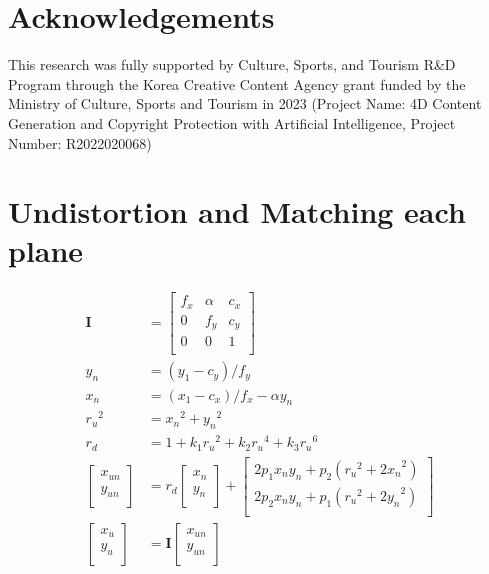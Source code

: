 \documentclass[preprint,12pt,authoryear]{elsarticle}
\begin{document}
\section*{Acknowledgements}
This research was fully supported by Culture, Sports, and Tourism R\&D Program through the Korea Creative Content Agency grant funded by the Ministry of Culture, Sports and Tourism in 2023 (Project Name: 4D Content Generation and Copyright Protection with Artificial Intelligence, Project Number: R2022020068)

\appendix

\section{Undistortion and Matching each plane}
\label{sec:equations}
\begin{equation}
\begin{aligned}
\textbf{I}&=\begin{bmatrix}
 f_{x} & \alpha & c_{x}  \\
 0 & f_{y} & c_{y}  \\
 0 & 0 & 1  \\
\end{bmatrix} \\
y_{n}&=(y_{1}-c_{y})/f_{y} \\
x_{n}&=(x_{1}-c_{x})/f_{x}-\alpha{y_{n}} \\
{r_{u}}^{2}&={x_{n}}^{2}+{y_{n}}^{2} \\
r_{d}&=1+k_{1}{r_{u}}^{2}+k_{2}{r_{u}}^{4}+k_{3}{r_{u}}^{6} \\
\begin{bmatrix}
 x_{un} \\
 y_{un} \\
\end{bmatrix}&=r_{d}\begin{bmatrix}
 x_{n} \\
 y_{n} \\
\end{bmatrix}+\begin{bmatrix}
 2p_{1}x_{n}y_{n}+p_{2}({r_{u}}^{2}+{2x_{n}}^{2}) \\
 2p_{2}x_{n}y_{n}+p_{1}({r_{u}}^{2}+{2y_{n}}^{2}) \\
\end{bmatrix} \\
\begin{bmatrix}
 x_{u} \\
 y_{u} \\
\end{bmatrix}&=\textbf{I}\begin{bmatrix}
 x_{un} \\
 y_{un} \\
\end{bmatrix}
\end{aligned}
\label{input:undistort}
\end{equation}
\end{document}
